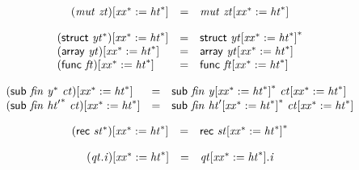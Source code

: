 $$
\begin{array}{@{}lcl@{}l@{}}
{({\mathit{mut}}~{\mathit{zt}})}{{}[{{\mathit{xx}}^\ast} := {{\mathit{ht}}^\ast}]} &=& {\mathit{mut}}~{{\mathit{zt}}}{{}[{{\mathit{xx}}^\ast} := {{\mathit{ht}}^\ast}]} &  \\
\end{array}
$$

$$
\begin{array}{@{}lcl@{}l@{}}
{(\mathsf{struct}~{{\mathit{yt}}^\ast})}{{}[{{\mathit{xx}}^\ast} := {{\mathit{ht}}^\ast}]} &=& \mathsf{struct}~{{{\mathit{yt}}}{{}[{{\mathit{xx}}^\ast} := {{\mathit{ht}}^\ast}]}^\ast} &  \\
{(\mathsf{array}~{\mathit{yt}})}{{}[{{\mathit{xx}}^\ast} := {{\mathit{ht}}^\ast}]} &=& \mathsf{array}~{{\mathit{yt}}}{{}[{{\mathit{xx}}^\ast} := {{\mathit{ht}}^\ast}]} &  \\
{(\mathsf{func}~{\mathit{ft}})}{{}[{{\mathit{xx}}^\ast} := {{\mathit{ht}}^\ast}]} &=& \mathsf{func}~{{\mathit{ft}}}{{}[{{\mathit{xx}}^\ast} := {{\mathit{ht}}^\ast}]} &  \\
\end{array}
$$

$$
\begin{array}{@{}lcl@{}l@{}}
{(\mathsf{sub}~{\mathit{fin}}~{{\mathit{y}}^\ast}~{\mathit{ct}})}{{}[{{\mathit{xx}}^\ast} := {{\mathit{ht}}^\ast}]} &=& \mathsf{sub}~{\mathit{fin}}~{{{\mathit{y}}}{{}[{{\mathit{xx}}^\ast} := {{\mathit{ht}}^\ast}]}^\ast}~{{\mathit{ct}}}{{}[{{\mathit{xx}}^\ast} := {{\mathit{ht}}^\ast}]} &  \\
{(\mathsf{sub}~{\mathit{fin}}~{{\mathit{ht}'}^\ast}~{\mathit{ct}})}{{}[{{\mathit{xx}}^\ast} := {{\mathit{ht}}^\ast}]} &=& \mathsf{sub}~{\mathit{fin}}~{{{\mathit{ht}'}}{{}[{{\mathit{xx}}^\ast} := {{\mathit{ht}}^\ast}]}^\ast}~{{\mathit{ct}}}{{}[{{\mathit{xx}}^\ast} := {{\mathit{ht}}^\ast}]} &  \\
\end{array}
$$

$$
\begin{array}{@{}lcl@{}l@{}}
{(\mathsf{rec}~{{\mathit{st}}^\ast})}{{}[{{\mathit{xx}}^\ast} := {{\mathit{ht}}^\ast}]} &=& \mathsf{rec}~{{{\mathit{st}}}{{}[{{\mathit{xx}}^\ast} := {{\mathit{ht}}^\ast}]}^\ast} &  \\
\end{array}
$$

$$
\begin{array}{@{}lcl@{}l@{}}
{({\mathit{qt}} . {\mathit{i}})}{{}[{{\mathit{xx}}^\ast} := {{\mathit{ht}}^\ast}]} &=& {{\mathit{qt}}}{{}[{{\mathit{xx}}^\ast} := {{\mathit{ht}}^\ast}]} . {\mathit{i}} &  \\
\end{array}
$$

